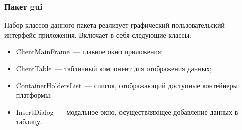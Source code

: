 \subsubsection{Пакет gui}
Набор классов данного пакета реализует графический пользовательский интерфейс приложения. Включает в себя следующие классы:
\begin{itemize}
\item ClientMainFrame~--- главное окно приложения;
\item ClientTable~--- табличный компонент для отображения данных;
\item ContainerHoldersList~--- список, отображающий доступные контейнеры платформы;
\item InsertDialog~--- модальное окно, осуществляющее добавление данных в таблицу.
\end{itemize}
